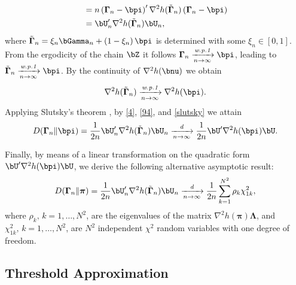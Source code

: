 \documentclass[10pt, twocolumn]{IEEEtran}
\begin{document}
\begin{IEEEproof}
\begin{align}
&= n\left( {{\boldsymbol{\Gamma} _n} - \bpi } \right)'{\nabla ^2}h( {{{\tilde {\boldsymbol{\Gamma}} }_n}} )\left( {{\boldsymbol{\Gamma} _n} - \bpi } \right)  \notag \\
&= \bU_n'{\nabla ^2}h( {{{\tilde {\boldsymbol{\Gamma}} }_n}} )\bU_n, \label{94}
\end{align}
where ${{\tilde {\boldsymbol{\Gamma}} }_n} = {\xi _n}{\bGamma _n} + \left( {1 - {\xi _n}} \right)\bpi $ is determined with some ${\xi _n} \in [0,1]$. From the ergodicity of the chain $\bZ$ it follows ${\boldsymbol{\Gamma}
	_n}\xrightarrow[{n \to \infty }]{{\textit{w.p.1}}}{\bpi} $, leading to ${\tilde{\boldsymbol{\Gamma}}
	_n}\xrightarrow[{n \to \infty }]{{\textit{w.p.1}}}{\bpi} $. By the continuity of ${\nabla
	^2}h( {\bnu})$ we obtain 
\begin{align}
{\nabla ^2}h( {{{\tilde {\boldsymbol{\Gamma}} }_n}} ) \xrightarrow[{n \to \infty }]{{\textit{w.p.1}}} {\nabla ^2}h( {{{\bpi }}} ).  \label{slutsky}
\end{align}
 Applying Slutsky's theorem \cite{billingsley2013convergence}, by \eqref{4}, \eqref{94}, and \eqref{slutsky} we attain
\begin{equation}
D( \boldsymbol{\Gamma}_n \| \bpi ) =
\frac{1}{{2n}}{\bU_n^{\prime}}{\nabla ^2}h({{{\tilde {\boldsymbol{\Gamma}} }_n}} )\bU_n \xrightarrow[{n \to \infty
}]{\textit{d}}  \frac{1}{{2n}}{\bU^{\prime}}{\nabla ^2}h( {\bpi} )\bU.  \notag
\end{equation}

Finally, by means of a linear transformation
	\cite{imhof1961computing} on the quadratic form ${\bU^{\prime}}{\nabla ^2}h( {\bpi} )\bU$, we derive the following alternative
	asymptotic result: 
	\begin{align} D( \boldsymbol{\Gamma}_n \|
	\boldsymbol{\pi} ) = \frac{1}{{2n}}{\bU_n^{\prime}}{\nabla ^2}h({{{\tilde {\boldsymbol{\Gamma}} }_n}} )\bU_n \xrightarrow[{n \to \infty
	}]{\textit{d}} \frac{1}{{2n}}\sum\limits_{k = 1}^{{N^2}} {{\rho _k}\chi
		_{1k}^2}, \notag
	\end{align}
	where $\rho_k, \, k = 1, \ldots, N^2$, are the eigenvalues of the matrix
	${\nabla ^2}h( {\boldsymbol{\pi}} )\boldsymbol{\Lambda}$, and $\chi
	_{1k}^2, \, k = 1, \ldots, N^2$, are $N^2$ independent $\chi^2$ random
	variables with one degree of freedom.
\end{IEEEproof}

\subsection{Threshold Approximation}
\end{document}
